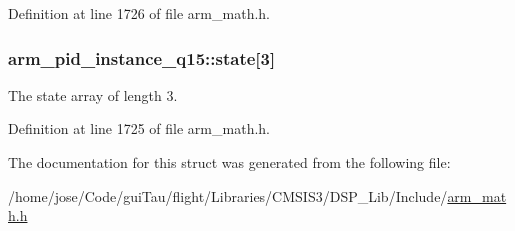 Definition at line 1726 of file arm\-\_\-math.\-h.

\hypertarget{structarm__pid__instance__q15_a4a3f0a878b5b6b055e3478a2f244cd30}{
\subsubsection[{state}]{ arm\-\_\-pid\-\_\-instance\-\_\-q15\-::state\mbox{[}3\mbox{]}}}\label{structarm__pid__instance__q15_a4a3f0a878b5b6b055e3478a2f244cd30}
The state array of length 3. 

Definition at line 1725 of file arm\-\_\-math.\-h.



The documentation for this struct was generated from the following file\-:\begin{DoxyCompactItemize}
\item 
/home/jose/\-Code/gui\-Tau/flight/\-Libraries/\-C\-M\-S\-I\-S3/\-D\-S\-P\-\_\-\-Lib/\-Include/\hyperlink{arm__math_8h}{arm\-\_\-math.\-h}\end{DoxyCompactItemize}
